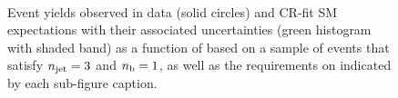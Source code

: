 \begin{figure}[h!]
\begin{center}
    \\
    \caption{Event yields observed in data (solid circles) and CR-fit SM expectations with their associated uncertainties (green histogram with shaded band) as a function of \HTmiss based on a sample of events that satisfy $n_{\text{jet}} = 3$ and $n_{\text{b}} = 1$, as well as the requirements on \scalht indicated by each sub-figure caption. }
    \label{fig:mhtdim_eq3j_eq1b}
  \end{center}
\end{figure}

